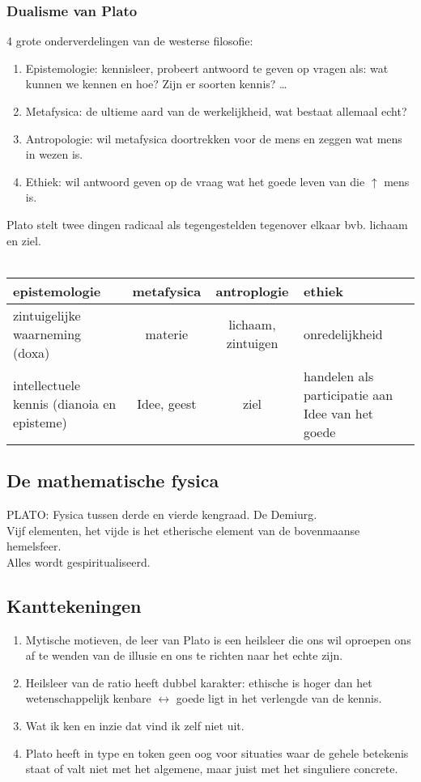 \documentclass[11pt,a4paper]{article}
\begin{document}
\subsubsection*{Dualisme van Plato}
4 grote onderverdelingen van de westerse filosofie:
\begin{enumerate}
\item Epistemologie: kennisleer, probeert antwoord te geven op vragen als: wat kunnen we kennen en hoe? Zijn er soorten kennis? \dots
\item Metafysica: de ultieme aard van de werkelijkheid, wat bestaat allemaal echt?
\item Antropologie: wil metafysica doortrekken voor de mens en zeggen wat mens in wezen is.
\item Ethiek: wil antwoord geven op de vraag wat het goede leven van die $\uparrow$ mens is.
\end{enumerate}
Plato stelt twee dingen radicaal als tegengestelden tegenover elkaar bvb. lichaam en ziel.
\\
\\
\begin{tabular}{p{4cm} c c p{5cm}}
	\hline
	\hline
	epistemologie & metafysica & antroplogie & ethiek \\
	\hline
	\hline
	zintuigelijke waarneming (doxa) & materie & lichaam, zintuigen & onredelijkheid \\
	\hline
	intellectuele kennis (dianoia en episteme) & Idee, geest & ziel & handelen als participatie aan Idee van het goede \\
	\hline
	\hline
\end{tabular}
\subsection{De mathematische fysica}
PLATO: 
Fysica tussen derde en vierde kengraad. 
De Demiurg.
\\
Vijf elementen, het vijde is het etherische element van de bovenmaanse hemelsfeer.
\\
Alles wordt gespiritualiseerd.
\subsection{Kanttekeningen}
\begin{enumerate}
\item Mytische motieven, de leer van Plato is een heilsleer die ons wil oproepen ons af te wenden van de illusie en ons te richten naar het echte zijn.
\item Heilsleer van de ratio heeft dubbel karakter: ethische is hoger dan het wetenschappelijk kenbare $\leftrightarrow$ goede ligt in het verlengde van de kennis.
\item Wat ik ken en inzie dat vind ik zelf niet uit.
\item Plato heeft in type en token geen oog voor situaties waar de gehele betekenis staat of valt niet met het algemene, maar juist met het singuliere concrete.
\end{enumerate}
\end{document}
